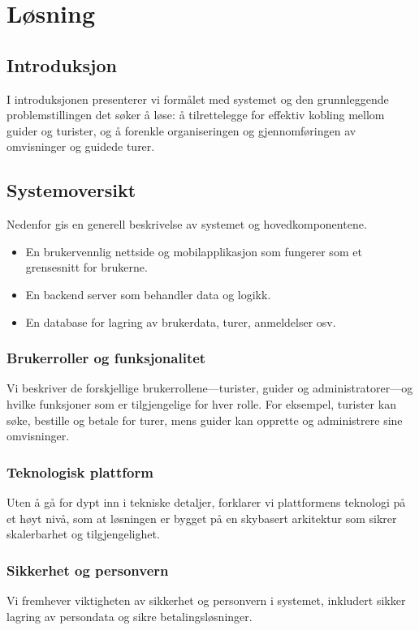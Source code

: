 \documentclass[../doc.tex]{subfiles}
\begin{document}
\section{Løsning}
\subsection*{Introduksjon}
I introduksjonen presenterer vi formålet med systemet og den grunnleggende problemstillingen det søker å løse: å tilrettelegge for effektiv kobling mellom guider og turister, og å forenkle organiseringen og gjennomføringen av omvisninger og guidede turer.

\subsection*{Systemoversikt}
Nedenfor gis en generell beskrivelse av systemet og hovedkomponentene.

\begin{itemize}
    \item 
    En brukervennlig nettside og mobilapplikasjon som fungerer som et grensesnitt for brukerne.
    \item 
    En backend server som behandler data og logikk.
    \item
    En database for lagring av brukerdata, turer, anmeldelser osv.
\end{itemize}

\subsubsection*{Brukerroller og funksjonalitet}
Vi beskriver de forskjellige brukerrollene---turister, guider og administratorer---og hvilke funksjoner som er tilgjengelige for hver rolle. For eksempel, turister kan søke, bestille og betale for turer, mens guider kan opprette og administrere sine omvisninger.

\subsubsection*{Teknologisk plattform}
Uten å gå for dypt inn i tekniske detaljer, forklarer vi plattformens teknologi på et høyt nivå, som at løsningen er bygget på en skybasert arkitektur som sikrer skalerbarhet og tilgjengelighet.

\subsubsection*{Sikkerhet og personvern}
Vi fremhever viktigheten av sikkerhet og personvern i systemet, inkludert sikker lagring av persondata og sikre betalingsløsninger.
\end{document}
